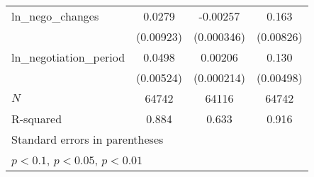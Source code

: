{\begin{tabular}{l*{3}{c}}
\addlinespace
ln\_nego\_changes&      0.0279\sym{***}&    -0.00257\sym{***}&       0.163\sym{***}\\
            &   (0.00923)         &  (0.000346)         &   (0.00826)         \\
\addlinespace
ln\_negotiation\_period&      0.0498\sym{***}&     0.00206\sym{***}&       0.130\sym{***}\\
            &   (0.00524)         &  (0.000214)         &   (0.00498)         \\
\midrule
\(N\)       &       64742         &       64116         &       64742         \\
R-squared   &       0.884         &       0.633         &       0.916         \\
\bottomrule
\multicolumn{4}{l}{\footnotesize Standard errors in parentheses}\\
\multicolumn{4}{l}{\footnotesize \sym{*} \(p<0.1\), \sym{**} \(p<0.05\), \sym{***} \(p<0.01\)}\\
\end{tabular}
}
